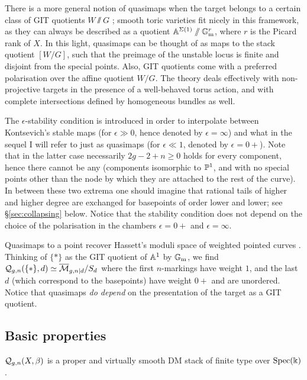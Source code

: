 \begin{rmk}
 There is a more general notion of quasimaps when the target belongs to a certain class of GIT quotients $W\sslash G$ \cite{CFKM}; smooth toric varieties fit nicely in this framework, as they can always be described as a quotient $\mathbb{A}^{\Sigma(1)}\sslash\mathbb{G}_{\text{m}}^r$, where $r$ is the Picard rank of $X$. In this light, quasimaps can be thought of as maps to the stack quotient $[W/G]$, such that the preimage of the unstable locus is finite and disjoint from the special points. Also, GIT quotients come with a preferred polarisation over the affine quotient $W/G$. The theory deals effectively with non-projective targets in the presence of a well-behaved torus action, and with complete intersections defined by homogeneous bundles as well.
\end{rmk}
\begin{rmk}
 The $\epsilon$-stability condition is introduced in order to interpolate between Kontsevich's stable maps (for $\epsilon\gg 0$, hence denoted by $\epsilon=\infty$) and what in the sequel I will refer to just as quasimaps (for $\epsilon\ll1$, denoted by $\epsilon=0+$). Note that in the latter case necessarily $2g-2+n \geq 0$ holds for every component, hence there cannot be any  (components isomorphic to $\mathbb P^1$, and with no special points other than the node by which they are attached to the rest of the curve). In between these two extrema one should imagine that rational tails of higher and higher degree are exchanged for basepoints of order lower and lower; see \S \ref{sec:collapsing} below. Notice that the stability condition does not depend on the choice of the polarisation in the chambers $\epsilon=0+$ \cite[Lemma 3.1.3]{CF-K} and $\epsilon=\infty$.
\end{rmk}

\begin{ex}\label{ex:qm_to_pt}
 Quasimaps to a point recover Hassett's moduli space of weighted pointed curves \cite{Hassett}. Thinking of $\{*\}$ as the GIT quotient of $\mathbb{A}^1$ by $\mathbb{G}_{\text{m}}$, we find $\mathcal{Q}_{g,n}(\{*\},d)\simeq \overline{\mathcal{M}}_{g,n|d}/S_d$ where the first $n$-markings have weight $1$, and the last $d$ (which correspond to the basepoints) have weight $0+$ and are unordered. Notice that quasimaps \emph{do depend} on the presentation of the target as a GIT quotient.
\end{ex}

\subsection{Basic properties}\label{sec:basic_qm}
\begin{thm}\cite[Theorems 3.2.1 and 4.0.1]{CF-K}
 $\mathcal{Q}_{g,n}(X,\beta)$ is a proper and virtually smooth DM stack of finite type over $\operatorname{Spec}(\Bbbk)$.
\end{thm}


